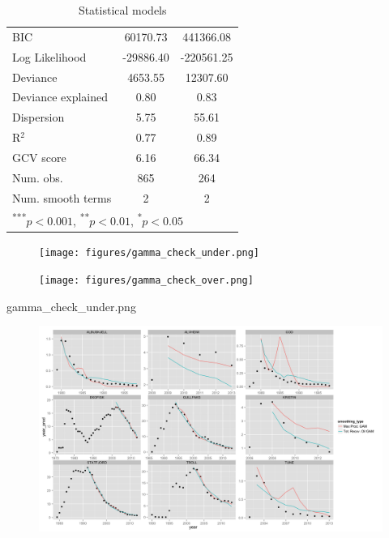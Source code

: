 \documentclass[12pt]{article}
\begin{document}
\begin{table}[h]
\begin{center}
\begin{tabular}{l c c }
BIC                                  & 60170.73      & 441366.08     \\
Log Likelihood                       & -29886.40     & -220561.25    \\
Deviance                             & 4653.55       & 12307.60      \\
Deviance explained                   & 0.80          & 0.83          \\
Dispersion                           & 5.75          & 55.61         \\
R$^2$                                & 0.77          & 0.89          \\
GCV score                            & 6.16          & 66.34         \\
Num. obs.                            & 865           & 264           \\
Num. smooth terms                    & 2             & 2             \\
\hline
\multicolumn{3}{l}{\scriptsize{\textsuperscript{***}$p<0.001$, 
  \textsuperscript{**}$p<0.01$, 
  \textsuperscript{*}$p<0.05$}}
\end{tabular}
\caption{Statistical models}
\label{table:gamma_check}
\end{center}
\end{table}


\begin{figure}
	\texttt{[image: figures/gamma\_check\_under.png]}
	\caption{}
	\label{chart:Max_prod_vs_TRO_print}
\end{figure}

\begin{figure}
	\texttt{[image: figures/gamma\_check\_over.png]}
	\caption{}
	\label{chart:Max_prod_vs_TRO_print}
\end{figure}

gamma_check_under.png

\begin{figure}
	\includegraphics[width=1\textwidth]{figures/Max_prod_vs_TRO_print.png}
	\caption{}
	\label{chart:Max_prod_vs_TRO_print}
\end{figure}



\end{document}
